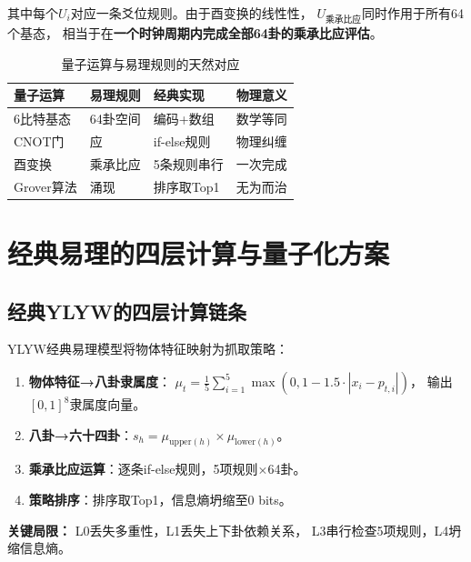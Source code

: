 \documentclass[twocolumn]{article}
\begin{document}
\noindent 其中每个$U_i$对应一条爻位规则。由于酉变换的线性性，
$U_{\text{乘承比应}}$同时作用于所有64个基态，
相当于在\textbf{一个时钟周期内完成全部64卦的乘承比应评估}。

\begin{table}[htbp]
\centering
\caption{量子运算与易理规则的天然对应}
\label{tab:mapping}
\begin{tabular}{p{2cm}p{2cm}p{3cm}p{2.5cm}}
\toprule
\textbf{量子运算} & \textbf{易理规则} & \textbf{经典实现} & \textbf{物理意义} \\
\midrule
6比特基态 & 64卦空间 & 编码+数组 & 数学等同 \\
CNOT门 & 应 & if-else规则 & 物理纠缠 \\
酉变换 & 乘承比应 & 5条规则串行 & 一次完成 \\
Grover算法 & 涌现 & 排序取Top1 & 无为而治 \\
\bottomrule
\end{tabular}
\end{table}

\section{经典易理的四层计算与量子化方案}

\subsection{经典YLYW的四层计算链条}

YLYW经典易理模型将物体特征映射为抓取策略：

\begin{enumerate}
  \item [L0] \textbf{物体特征→八卦隶属度}：
  $\mu_t = \frac{1}{5}\sum_{i=1}^5 \max(0, 1 - 1.5 \cdot |x_i - p_{t,i}|)$，
  输出$[0,1]^8$隶属度向量。
  \item [L1] \textbf{八卦→六十四卦}：$s_h = \mu_{\text{upper}(h)} \times \mu_{\text{lower}(h)}$。
  \item [L3] \textbf{乘承比应运算}：逐条if-else规则，5项规则$\times$64卦。
  \item [L4] \textbf{策略排序}：排序取Top1，信息熵坍缩至0 bits。
\end{enumerate}

\noindent \textbf{关键局限：} L0丢失多重性，L1丢失上下卦依赖关系，
L3串行检查5项规则，L4坍缩信息熵。
\end{document}
